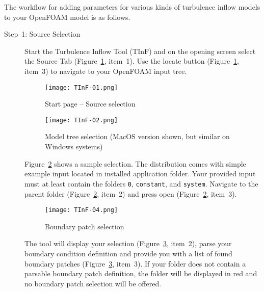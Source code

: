 \label{sec:TInF-usage}

The workflow for adding parameters for various kinds of turbulence inflow models to your 
OpenFOAM model is as follows.

\begin{description}
\item[Step~1: Source Selection] Start the Turbulence Inflow Tool (TInF) and on the opening screen select the Source Tab (Figure~\ref{fig:TInF01}, item~1).  Use the locate button (Figure~\ref{fig:TInF01}, item~3) to navigate to your OpenFOAM input tree.  
\begin{figure}[htb]
	\begin{center}
		\vspace*{-1.0\baselineskip}
		\texttt{[image: TInF-01.png]}
		\vspace*{-1.5\baselineskip}
		\caption{Start page -- Source selection}
		\label{fig:TInF01}
	\end{center}
\end{figure}

\begin{figure}[ht]
	\begin{center}
		\vspace*{-1.0\baselineskip}
		\texttt{[image: TInF-02.png]}
		\vspace*{-1.5\baselineskip}
		\caption{Model tree selection (MacOS version shown, but similar on Windows systems)}
		\label{fig:TInF02}
	\end{center}
\end{figure}
Figure~\ref{fig:TInF02} shows a sample selection. The distribution comes with simple example input located in installed application folder.  Your provided input must at least contain the folders \texttt{0}, \texttt{constant}, and \texttt{system}. Navigate to the parent folder (Figure~\ref{fig:TInF02}, item~2) and press open (Figure~\ref{fig:TInF02}, item~3).

\begin{figure}[ht]
	\begin{center}
		\texttt{[image: TInF-04.png]}
		\caption{Boundary patch selection}
		\label{fig:TInF04}
	\end{center}
\end{figure}
The tool will display your selection (Figure~\ref{fig:TInF04}, item~2), parse your boundary condition definition and provide you with a list of found boundary patches (Figure~\ref{fig:TInF04}, item~3).  If your folder does not contain a parsable boundary patch definition, the folder will be displayed in red and no boundary patch selection will be offered.


\end{description}
